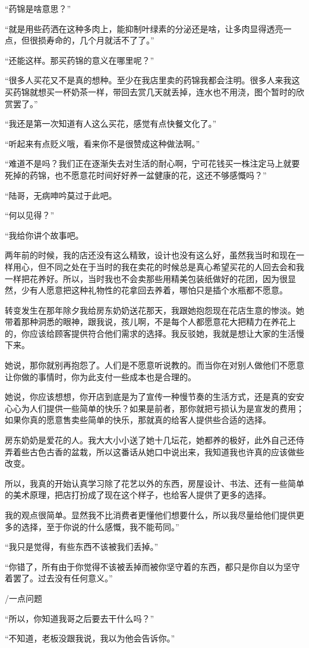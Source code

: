 \documentclass[a4paper, 10pt]{article}
\begin{document}
“药锦是啥意思？”

“就是用些药洒在这种多肉上，能抑制叶绿素的分泌还是啥，让多肉显得透亮一点，但很损寿命的，几个月就活不了了。”

“还能这样。那买药锦的意义在哪里呢？”

“很多人买花又不是真的想种。至少在我店里卖的药锦我都会注明。很多人来我这买药锦就想买一杯奶茶一样，带回去赏几天就丢掉，连水也不用浇，图个暂时的欣赏罢了。”

“我还是第一次知道有人这么买花，感觉有点快餐文化了。”

“听起来有点贬义哦，看来你不是很赞成这种做法啊。”

“难道不是吗？我们正在逐渐失去对生活的耐心啊，宁可花钱买一株注定马上就要死掉的药锦，也不愿意花时间好好养一盆健康的花，这还不够感慨吗？”

“陆哥，无病呻吟莫过于此吧。

“何以见得？”

“我给你讲个故事吧。

两年前的时候，我的店还没有这么精致，设计也没有这么好，虽然我当时和现在一样用心，但不同之处在于当时的我在卖花的时候总是真心希望买花的人回去会和我一样把花养好。所以，当时我也不会卖那些用精美包装纸做好的花团，因为很显然，少有人愿意把这种礼物性的花拿回去养着，哪怕只是插个水瓶都不愿意。

转变发生在那年除夕我给房东奶奶送花那天，我跟她抱怨现在花店生意的惨淡。她带着那种洞悉的眼神，跟我说，孩儿啊，不是每个人都愿意花大把精力在养花上的，你应该给顾客提供符合他们需求的选择。我反驳她，我就是想让大家的生活慢下来。

她说，那你就别再抱怨了。人们是不愿意听说教的。而当你在对别人做他们不愿意让你做的事情时，你为此支付一些成本也是合理的。

她说，你应该想想，你开店到底是为了宣传一种慢节奏的生活方式，还是真的安安心心为人们提供一些简单的快乐？如果是前者，那你就把亏损认为是宣发的费用；如果你真的愿意售卖些简单的快乐，那就真的给客人提供些合适的选择。

房东奶奶是爱花的人。我大大小小送了她十几坛花，她都养的极好，此外自己还侍弄着些古色古香的盆栽，所以这番话从她口中说出来，我知道我也许真的应该做些改变。

所以，我真的开始认真学习除了花艺以外的东西，房屋设计、书法、还有一些简单的美术原理，把店打扮成了现在这个样子，也给客人提供了更多的选择。

我的观点很简单。显然我不比消费者更懂他们想要什么，所以我尽量给他们提供更多的选择，至于你说的什么感慨，我不能苟同。”

“我只是觉得，有些东西不该被我们丢掉。”

“你错了，所有由于你觉得不该被丢掉而被你坚守着的东西，都只是你自以为坚守着罢了。过去没有任何意义。”

\vspace{10pt}

/一点问题

\vspace{10pt}

“所以，你知道我哥之后要去干什么吗？”

“不知道，老板没跟我说，我以为他会告诉你。”
\end{document}
